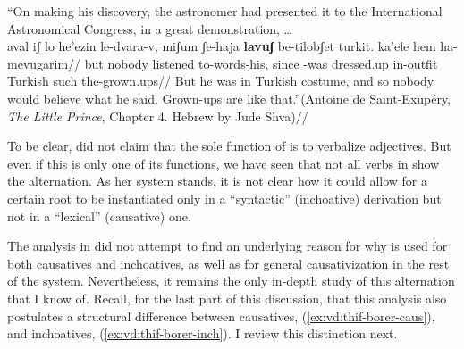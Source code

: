 	\a ``On making his discovery, the astronomer had presented it to the International Astronomical Congress, in a great demonstration, \dots\\
	\begingl
		\gla aval iʃ lo he'ezin le-dvara-v, miʃum ʃe-haja \textbf{lavuʃ} be-tilobʃet turkit. ka'ele hem ha-mevugarim//
		\glb but nobody  listened to-words-his, since -was dressed.up in-outfit Turkish such  the-grown.ups//
		\glft But he was in Turkish costume, and so nobody would believe what he said. Grown-ups are like that.''\hfill {(Antoine de Saint-Exup\'ery, \emph{The Little Prince}, Chapter 4. Hebrew by Jude Shva\footnotemark)}//
	\endgl
{}
\xe

To be clear, \cite{borer91} did not claim that the sole function of {\thif} is to verbalize adjectives. But even if this is only one of its functions, we have seen that not all verbs in {\thif} show the alternation. As her system stands, it is not clear how it could allow for a certain root to be instantiated only in a ``syntactic'' (inchoative) derivation but not in a ``lexical'' (causative) one.

The analysis in \cite{borer91} did not attempt to find an underlying reason for why {\thif} is used for both causatives and inchoatives, as well as for general causativization in the rest of the system. Nevertheless, it remains the only in-depth study of this alternation that I know of. Recall, for the last part of this discussion, that this analysis also postulates a structural difference between {\thif} causatives, (\ref{ex:vd:thif-borer-caus}), and inchoatives, (\ref{ex:vd:thif-borer-inch}). I review this distinction next.

